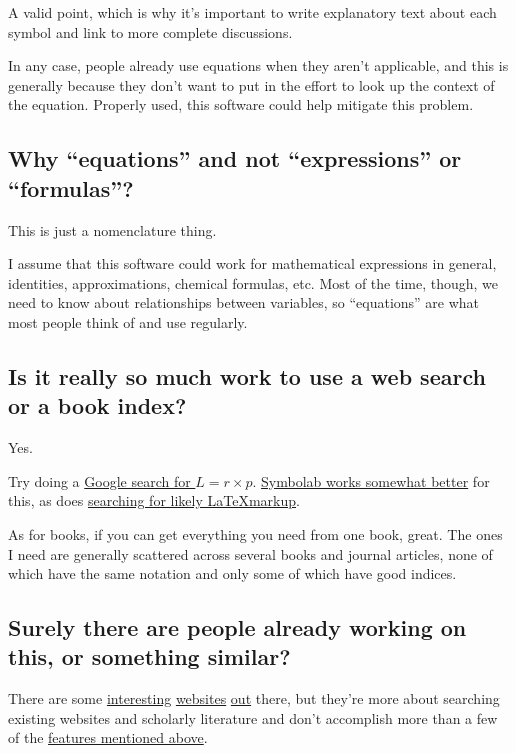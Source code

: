 \documentclass[12pt,letterpaper]{article}
\begin{document}
A valid point, which is why it's important to write explanatory text about each symbol and link to more complete discussions.

In any case, people already use equations when they aren't applicable, and this is generally because they don't want to put in the effort to look up the context of the equation. Properly used, this software could help mitigate this problem.

\subsection{Why ``equations'' and not ``expressions'' or ``formulas''?}

This is just a nomenclature thing.

I assume that this software could work for mathematical expressions in general, identities, approximations, chemical formulas, etc. Most of the time, though, we need to know about relationships between variables, so ``equations'' are what most people think of and use regularly.

\subsection{Is it really so much work to use a web search or a book index?}

Yes.

Try doing a \href{https://www.google.com/search?q=%22L+%3D+r+%C3%97+P%22&oq=%22L+%3D+r+%C3%97+P%22}{Google search for $L = r \times p$}. \href{http://symbolab.com/search?origin=suggestion&query=L%3Dr%5Ctimes%20p}{Symbolab works somewhat better} for this, as does \href{https://www.google.com/search?&q=%
}{searching for likely \LaTeX markup}.


As for books, if you can get everything you need from one book, great. The ones I need are generally scattered across several books and journal articles, none of which have the same notation and only some of which have good indices.

\subsection{Surely there are people already working on this, or something similar?}

There are some \href{http://symbolab.com/}{interesting} \href{http://latexsearch.com/}{websites} \href{http://www.dessci.com/en/reference/searching/math-searching.htm}{out} there, but they're more about searching existing websites and scholarly literature and don't accomplish more than a few of the \hyperref[features]{features mentioned above}.
\end{document}
